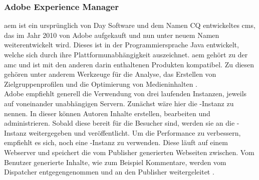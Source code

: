 \subsubsection{Adobe Experience Manager}
\label{sec:aem}
\acf{aem} ist ein ursprünglich von Day Software und dem Namen CQ entwickeltes \ac{cms}, das im Jahr 2010 von Adobe aufgekauft und nun unter neuem Namen weiterentwickelt wird. Dieses ist in der Programmiersprache Java entwickelt, welche sich durch ihre Plattformunabhängigkeit auszeichnet. \ac{aem} gehört zu der \ac{amc} und ist mit den anderen darin enthaltenen Produkten kompatibel. Zu diesen gehören unter anderem Werkzeuge für die Analyse, das Erstellen von Zielgruppenprofilen und die Optimierung von Medieninhalten \cite[S. 1-2]{Incorporated2015}. \\
Adobe empfiehlt generell die Verwendung von drei laufenden Instanzen, jeweils auf voneinander unabhängigen Servern. Zunächst wäre hier die -Instanz zu nennen. In dieser können Autoren Inhalte erstellen, bearbeiten und administrieren. Sobald diese bereit für die Besucher sind, werden sie an die -Instanz weitergegeben und veröffentlicht. Um die Performance zu verbessern, empfiehlt es sich, noch eine -Instanz zu verwenden. Diese läuft auf einem Webserver und speichert die vom Publisher generierten Webseiten zwischen. Vom Benutzer generierte Inhalte, wie zum Beispiel Kommentare, werden vom Dispatcher entgegengenommen und an den Publisher weitergeleitet \cite[S. 1-3 f.]{Incorporated2015}.
















